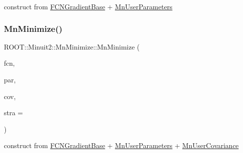 construct from \mbox{\hyperlink{classROOT_1_1Minuit2_1_1FCNGradientBase}{F\+C\+N\+Gradient\+Base}} + \mbox{\hyperlink{classROOT_1_1Minuit2_1_1MnUserParameters}{Mn\+User\+Parameters}} 

\mbox{\label{classROOT_1_1Minuit2_1_1MnMinimize_a669845a1aaba36456664f1e98a615e25}} 
\subsubsection{\texorpdfstring{MnMinimize()}{MnMinimize()}\hspace{0.1cm}{\footnotesize\ttfamily [24/26]}}
{\footnotesize\ttfamily R\+O\+O\+T\+::\+Minuit2\+::\+Mn\+Minimize\+::\+Mn\+Minimize (\begin{DoxyParamCaption}\item[{const \mbox{\hyperlink{classROOT_1_1Minuit2_1_1FCNGradientBase}{F\+C\+N\+Gradient\+Base}} \&}]{fcn,  }\item[{const \mbox{\hyperlink{classROOT_1_1Minuit2_1_1MnUserParameters}{Mn\+User\+Parameters}} \&}]{par,  }\item[{const \mbox{\hyperlink{classROOT_1_1Minuit2_1_1MnUserCovariance}{Mn\+User\+Covariance}} \&}]{cov,  }\item[{unsigned int}]{stra = {} }\end{DoxyParamCaption})\hspace{0.3cm}{\ttfamily [inline]}}



construct from \mbox{\hyperlink{classROOT_1_1Minuit2_1_1FCNGradientBase}{F\+C\+N\+Gradient\+Base}} + \mbox{\hyperlink{classROOT_1_1Minuit2_1_1MnUserParameters}{Mn\+User\+Parameters}} + \mbox{\hyperlink{classROOT_1_1Minuit2_1_1MnUserCovariance}{Mn\+User\+Covariance}} 

\mbox{\label{classROOT_1_1Minuit2_1_1MnMinimize_ae607cd588cff70b64c0705bb86a36ba0}} 
